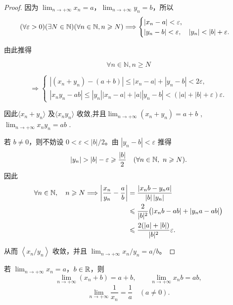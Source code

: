 \begin{proof}

因为 \(\lim_{n\to+\infty}x_n=a\)，\(\lim_{n\to+\infty}y_n=b\)，所以
\[
(\forall\varepsilon>0)(\exists N\in\N)(\forall n\in\N, n\geqslant N)
\Longrightarrow
\begin{cases}
|x_n-a|<\varepsilon,\\
|y_n-b|<\varepsilon,\quad |y_n|<|b|+\varepsilon.
\end{cases}
\]

由此推得

\[\forall n \in \mathbb{N}, n \geqslant N\]

\[\Longrightarrow
\begin{cases}
|(x_n+y_n)-(a+b)|\leqslant|x_n-a|+|y_n-b|<2\varepsilon,\\
|x_ny_n-ab|\leqslant|y_n||x_n-a|+|a||y_n-b|
<( |a|+|b|+\varepsilon)\varepsilon.
\end{cases}
\]

因此\(\langle x_n + y_n \rangle\) 及\(\langle x_n y_n \rangle\) 收敛,并且\(\lim_{n \to +\infty} (x_n + y_n) = a + b\) ,\(\lim_{n \to +\infty} x_n y_n = ab\) .

若 \(b\ne0\)，则不妨设 \(0<\varepsilon<|b|/2\)。由 \(|y_n-b|<\varepsilon\) 推得
\[
|y_n|>|b|-\varepsilon\geqslant\frac{|b|}{2}\quad(\forall n\in\N,\ n\geqslant N).
\]
因此
\[
\begin{aligned}
\forall n\in\mathbb{N},\quad n\geqslant N\Longrightarrow
\left|\frac{x_n}{y_n}-\frac ab\right|
&=\frac{|x_nb-y_na|}{|b|\,|y_n|}\\
&\leqslant\frac{2}{|b|^2}\bigl(|x_nb-ab|+|y_na-ab|\bigr)\\
&\leqslant\frac{2(|a|+|b|)}{|b|^2}\varepsilon.
\end{aligned}
\]

从而 \(\left\langle x_n/y_n\right\rangle\) 收敛，并且
\(\lim_{n\to+\infty}x_n/y_n=a/b\)。

\end{proof}

\begin{mycor*}{}
若 \(\lim_{n\to+\infty}x_n=a\)，\(b\in\mathbb{R}\)，则
\[
\lim_{n\to+\infty}(x_n+b)=a+b,\qquad
\lim_{n\to+\infty}x_nb=ab,
\]
\[
\lim_{n\to+\infty}\frac1{x_n}=\frac1a\quad(a\ne0).
\]
\end{mycor*}

